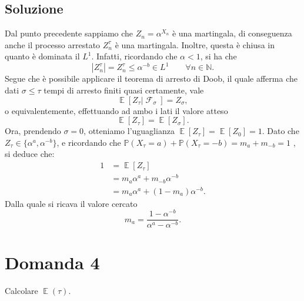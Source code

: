 \documentclass[
	12pt, %
]{fphw}
\DeclareMathOperator{\Ev}{\mathbb{E}}%
\DeclareMathOperator{\F}{\mathcal{F}}%
\begin{document}
\subsection*{Soluzione}
Dal punto precedente sappiamo che $Z_n = \alpha^{X_n}$ è una martingala, di conseguenza anche il processo arrestato $Z_n^{\tau}$ è una martingala.
Inoltre, questa è chiusa in quanto è dominata il $L^1$. Infatti, ricordando che $\alpha < 1$, si ha che
\begin{equation*}
    |Z_n^{\tau}| = Z_n^{\tau} \leq \alpha^{-b} \in L^1 \qquad \forall n \in \mathbb{N}.
\end{equation*}
Segue che è possibile applicare il teorema di arresto di Doob, il quale afferma che dati $\sigma \leq \tau$ tempi di arresto finiti quasi certamente, vale
\begin{equation*}
    \Ev[Z_{\tau} | \F_{\sigma}] = Z_{\sigma},
\end{equation*}
o equivalentemente, effettuando ad ambo i lati il valore atteso
\begin{equation*}
    \Ev[Z_{\tau}] = \Ev[Z_{\sigma}].
\end{equation*}
Ora, prendendo $\sigma = 0$, otteniamo l'uguaglianza $\Ev[Z_{\tau}] = \Ev[Z_0] = 1$.
Dato che $Z_{\tau} \in \{ \alpha^a, \alpha^{-b} \}$, e ricordando che $\mathbb{P}(X_{\tau} = a) + \mathbb{P}(X_{\tau} = -b) = m_a + m_{-b} = 1$ , si deduce che:
\begin{equation*}
    \begin{aligned}
        1 &= \Ev[Z_{\tau}]\\
        &= m_a \alpha^a + m_{-b} \alpha^{-b}\\
        &= m_a \alpha^a + (1 - m_a) \alpha^{-b}.
    \end{aligned}
\end{equation*}
Dalla quale si ricava il valore cercato
\begin{equation} \label{eq:ma}
    m_a = \frac{1-\alpha^{-b}}{\alpha^a-\alpha^{-b}}.
\end{equation}

\newpage
\section*{Domanda 4}
\begin{problem}
	Calcolare $\Ev(\tau)$.
	\smallskip
\end{problem}
\end{document}
